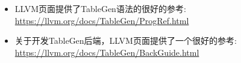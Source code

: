 
\begin{itemize}
\item LLVM页面提供了TableGen语法的很好的参考: \url{https://llvm.org/docs/TableGen/ProgRef.html}

\item 关于开发TableGen后端，LLVM页面提供了一个很好的参考: \url{https://llvm.org/docs/TableGen/BackGuide.html}
\end{itemize}